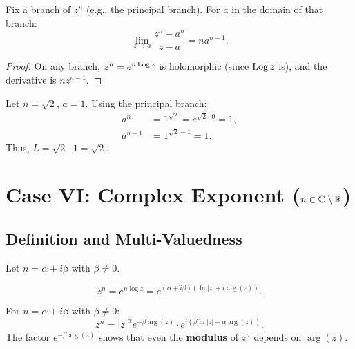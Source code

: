 \begin{theorem}
Fix a branch of $z^n$ (e.g., the principal branch). For $a$ in the domain of that branch:
\begin{equation}
\lim_{z \to a} \frac{z^n - a^n}{z - a} = n a^{n-1}.
\end{equation}
\end{theorem}

\begin{proof}
On any branch, $z^n = e^{n \operatorname{Log} z}$ is holomorphic (since $\operatorname{Log} z$ is), and the derivative is $n z^{n-1}$.
\end{proof}

\begin{example}
Let $n = \sqrt{2}$, $a = 1$. Using the principal branch:
\begin{align}
a^n &= 1^{\sqrt{2}} = e^{\sqrt{2} \cdot 0} = 1, \\
a^{n-1} &= 1^{\sqrt{2}-1} = 1.
\end{align}
Thus, $L = \sqrt{2} \cdot 1 = \sqrt{2}$.
\end{example}

\section{Case VI: Complex Exponent ($n \in \mathbb{C} \setminus \mathbb{R}$)}

\subsection{Definition and Multi-Valuedness}

Let $n = \alpha + i\beta$ with $\beta \neq 0$.

\begin{definition}
\begin{equation}
z^n = e^{n \log z} = e^{(\alpha + i\beta)(\ln|z| + i\arg(z))}.
\end{equation}
\end{definition}

\begin{proposition}
For $n = \alpha + i\beta$ with $\beta \neq 0$:
\begin{equation}
z^n = |z|^\alpha e^{-\beta \arg(z)} \cdot e^{i(\beta \ln|z| + \alpha \arg(z))}.
\end{equation}
The factor $e^{-\beta \arg(z)}$ shows that even the \textbf{modulus} of $z^n$ depends on $\arg(z)$.
\end{proposition}

